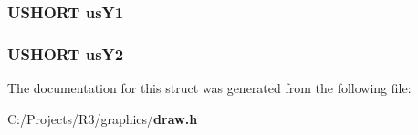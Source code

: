 \subsubsection[{usY1}]{\setlength{\rightskip}{0pt plus 5cm}USHORT {\bf usY1}}\label{struct_d_r_a_w___l_i_n_e___s_t_r_u_c_t_a73ef43b6d653054d0bd01a0db0c0769a}
\subsubsection[{usY2}]{\setlength{\rightskip}{0pt plus 5cm}USHORT {\bf usY2}}\label{struct_d_r_a_w___l_i_n_e___s_t_r_u_c_t_a8cbe00769510a38916301d8829cd5795}


The documentation for this struct was generated from the following file:\begin{DoxyCompactItemize}
\item 
C:/Projects/R3/graphics/{\bf draw.h}\end{DoxyCompactItemize}
